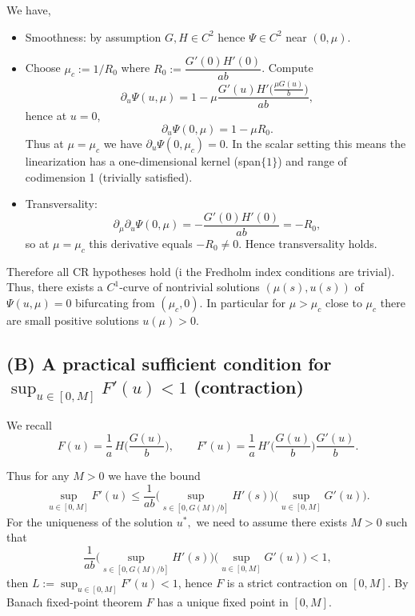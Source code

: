 \documentclass[a4paper,11pt]{amsart}
\theoremstyle{definition}
\numberwithin{equation}{section}
\theoremstyle{definition}
\begin{document}
We have,
\begin{itemize}
  \item Smoothness: by assumption \(G,H\in C^2\) hence \(\Psi\in C^2\) near \((0,\mu)\).
  \item Choose \(\mu_c:=1/R_0\) where
    \(R_0:=\dfrac{G'(0)H'(0)}{ab}\). Compute
    \[
    \partial_u\Psi(u,\mu)=1-\mu\frac{G'(u)H'\!\big(\frac{\mu G(u)}{b}\big)}{ab},
    \]
    hence at \(u=0\),
    \[
    \partial_u\Psi(0,\mu)=1-\mu R_0.
    \]
    Thus at \(\mu=\mu_c\) we have \(\partial_u\Psi(0,\mu_c)=0\). In the scalar setting this means the linearization has a one-dimensional kernel (span\(\{1\}\)) and range of codimension 1 (trivially satisfied).
  \item Transversality:
    \[
    \partial_\mu\partial_u\Psi(0,\mu)
    = -\frac{G'(0)H'(0)}{ab} = -R_0,
    \]
    so at \(\mu=\mu_c\) this derivative equals \(-R_0\neq0\). Hence transversality holds.
\end{itemize}

Therefore all CR hypotheses hold (i the Fredholm index conditions are trivial). Thus, there exists a \(C^1\)-curve of nontrivial solutions \((\mu(s),u(s))\) of \(\Psi(u,\mu)=0\) bifurcating from \((\mu_c,0)\). In particular for \(\mu>\mu_c\) close to \(\mu_c\) there are small positive solutions \(u(\mu)>0\).


\subsection*{(B) A practical sufficient condition for $\sup_{u\in[0,M]}F'(u)<1$ (contraction)}

We recall
\[
F(u)=\frac{1}{a}\,H\!\Big(\frac{G(u)}{b}\Big),
\qquad
F'(u)=\frac{1}{a}\,H'\!\Big(\frac{G(u)}{b}\Big)\frac{G'(u)}{b}.
\]

Thus for any \(M>0\) we have the bound
\[
\sup_{u\in[0,M]}F'(u)
\le \frac{1}{ab}\Big(\sup_{s\in[0,G(M)/b]} H'(s)\Big)\Big(\sup_{u\in[0,M]} G'(u)\Big).
\]
For the uniqueness of the solution $u^\ast,$ we need to assume   there exists \(M>0\) such that
\[
\frac{1}{ab}\Big(\sup_{s\in[0,G(M)/b]} H'(s)\Big)\Big(\sup_{u\in[0,M]} G'(u)\Big) < 1,
\]
then \(L:=\sup_{u\in[0,M]}F'(u)<1\), hence \(F\) is a strict contraction on \([0,M]\). By Banach fixed-point theorem \(F\) has a unique fixed point in \([0,M]\).
\end{document}
